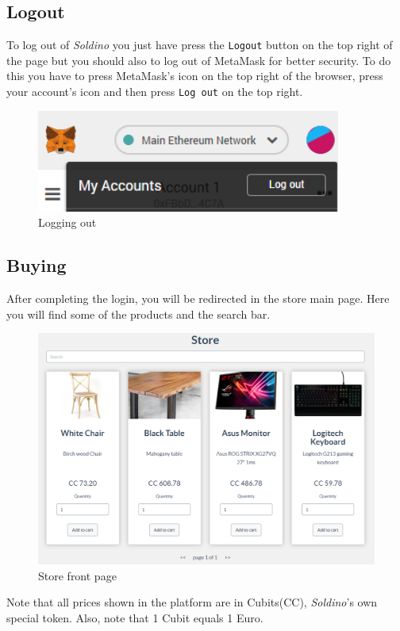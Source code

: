 	\subsection{Logout}
	To log out of \textit{Soldino} you just have press the \texttt{Logout} button on 
	the top right of the page but you should also to log out of MetaMask\glosp{} 
	for better security. To do this you have to press MetaMask's icon on the top 
	right of the browser, press your account's icon and then press \texttt{Log out}
	on the top right.
	\begin{figure}[H]
		\includegraphics[width=10cm]{res/images/logout_metamask.png}
		\centering
		\caption{Logging out}
	\end{figure}
	\subsection{Buying}
	After completing the login, you will be redirected in the store main page. 
	Here you will find some of the products and the search bar.
	\begin{figure}[H]
		\includegraphics[width=15cm]{res/images/store_main_page.png}
		\centering
		\caption{Store front page}
	\end{figure}
	\noindent Note that all prices shown in the platform are in Cubits\glosp (CC\glo), 
	\textit{Soldino}'s own special token. Also, note that 1 Cubit equals 1 Euro.
